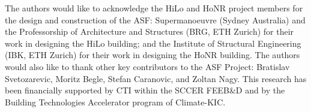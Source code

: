 
The authors would like to acknowledge the HiLo and HoNR project members for the design and construction of the ASF: Supermanoeuvre (Sydney Australia) and the Professorship of Architecture and Structures (BRG, ETH Zurich) for their work in designing the HiLo building; and the Institute of Structural Engineering (IBK, ETH Zurich) for their work in designing the HoNR building. The authors would also like to thank other key contributors to the ASF Project: Bratislav Svetozarevic, Moritz Begle, Stefan Caranovic, and Zoltan Nagy. This research has been financially supported by CTI within the SCCER FEEB\&D and by the Building Technologies Accelerator program of Climate-KIC.